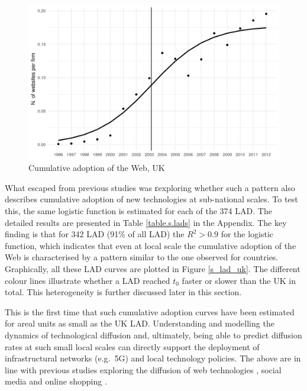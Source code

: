 \documentclass[
  authoryear,
  preprint,
  3p]{elsarticle}
\begin{document}
\begin{figure}[H]

{\centering \includegraphics[width=1\textwidth,height=\textheight]{../../outputs/s/s_uk_per_firm.png}

}

\caption{\label{s_uk}Cumulative adoption of the Web, UK}

\end{figure}%

What escaped from previous studies was εexploring whether such a pattern
also describes cumulative adoption of new technologies at sub-national
scales. To test this, the same logistic function is estimated for each
of the 374 LAD. The detailed results are presented in Table
\ref{table.s.lads} in the Appendix. The key finding is that for 342 LAD
(91\% of all LAD) the \(R^2 > 0.9\) for the logistic function, which
indicates that even at local scale the cumulative adoption of the Web is
characterised by a pattern similar to the one observed for countries.
Graphically, all these LAD curves are plotted in Figure \ref{s_lad_uk}.
The different colour lines illustrate whether a LAD reached \(t_0\)
faster or slower than the UK in total. This heterogeneity is further
discussed later in this section.

This is the first time that such cumulative adoption curves have been
estimated for areal units as small as the UK LAD. Understanding and
modelling the dynamics of technological diffusion and, ultimately, being
able to predict diffusion rates at such small local scales can directly
support the deployment of infrastructural networks (e.g.~5G) and local
technology policies. The above are in line with previous studies
exploring the diffusion of web technologies
\citep{PAPAGIANNIDIS2015308}, social media \citep{lengyel2020role} and
online shopping \citep{bakher2013diffusion}.
\end{document}
